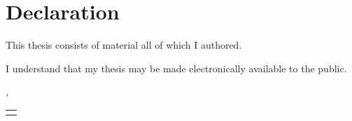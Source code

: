 \chapter*{Declaration}
\thispagestyle{empty}
This thesis consists of material all of which I authored.

I understand that my thesis may be made electronically available to the public.
\bigskip

\noindent\textit{\myLocation, \myTime}

\smallskip

\begin{flushright}
    \begin{tabular}{m{5cm}}
        \\ \midrule
        \centering\myName{} \\
    \end{tabular}
\end{flushright}
